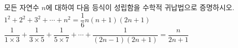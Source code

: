 모든 자연수 $n$에 대하여 다음 등식이 성립함을 수학적 귀납법으로 증명하시오.
 $1^2+2^2+3^2+\cdots+n^2=\dfrac{1}{6}n(n+1)(2n+1)$
 $\dfrac{1}{1\times 3}+\dfrac{1}{3\times 5}+\dfrac{1}{5\times 7}+\cdots+\dfrac{1}{(2n-1)(2n+1)}=\dfrac{n}{2n+1}$
